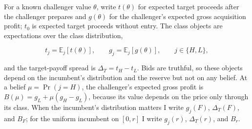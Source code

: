 For a known challenger value \(\theta\), write \(t(\theta)\) for
expected target proceeds after the challenger prepares and
\(g(\theta)\) for the challenger's expected gross acquisition profit;
\(t_0\) is expected target proceeds without entry. The class objects are
expectations over the class distribution,

\[
t_j=\mathbb E_j[t(\theta)],\qquad g_j=\mathbb E_j[g(\theta)],\qquad
j\in\{H,L\},
\]

and the target-payoff spread is \(\Delta_T=t_H-t_L\). Bids are truthful,
so these objects depend on the incumbent's distribution and the reserve
but not on any belief. At a belief \(\mu=\Pr(j=H)\), the challenger's
expected gross profit is \(B(\mu)=g_L+\mu(g_H-g_L)\), because its value
depends on the price only through its class. When the incumbent's
distribution matters I write \(g_j(F)\), \(\Delta_T(F)\), and \(B_F\);
for the uniform incumbent on \([0,r]\) I write \(g_j(r)\),
\(\Delta_T(r)\), and \(B_r\).
